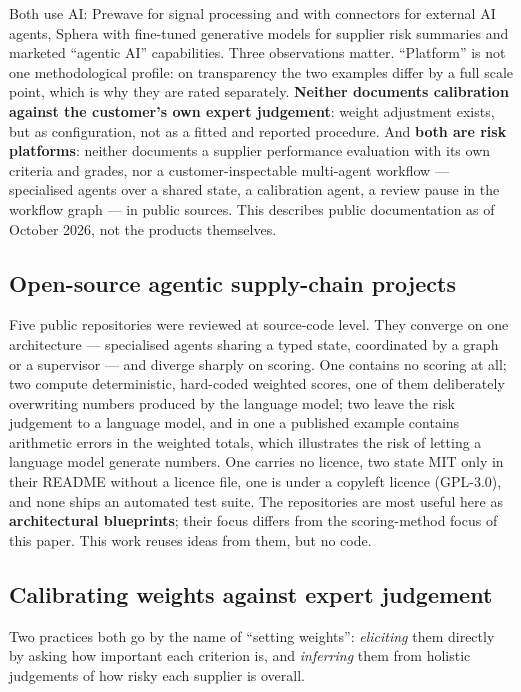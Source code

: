 \documentclass[10pt,twocolumn,a4paper]{article}
\begin{document}
Both use AI: Prewave for signal processing and with connectors for external AI agents,
Sphera with fine-tuned generative models for supplier risk summaries and marketed
``agentic AI'' capabilities. Three observations matter. ``Platform'' is not one
methodological profile: on transparency the two examples differ by a full scale point,
which is why they are rated separately. \textbf{Neither documents calibration against
the customer's own expert judgement}: weight adjustment exists, but as configuration,
not as a fitted and reported procedure. And \textbf{both are risk platforms}: neither
documents a supplier performance evaluation with its own criteria and grades, nor a
customer-inspectable multi-agent workflow --- specialised agents over a shared state, a
calibration agent, a review pause in the workflow graph --- in public sources. This
describes public documentation as of October 2026, not the products themselves.

\subsection{Open-source agentic supply-chain projects}
Five public repositories were reviewed at source-code level. They converge on one
architecture --- specialised agents sharing a typed state, coordinated by a graph or a
supervisor --- and diverge sharply on scoring. One contains no scoring at all; two
compute deterministic, hard-coded weighted scores, one of them deliberately overwriting
numbers produced by the language model; two leave the risk judgement to a language
model, and in one a published example contains arithmetic errors in the weighted
totals, which illustrates the risk of letting a language model generate numbers. One carries no licence, two state MIT only in their README without a licence file, one is under a copyleft licence (GPL-3.0), and none ships an automated test
suite. The repositories are most useful here as \textbf{architectural blueprints}; their
focus differs from the scoring-method focus of this paper. This work reuses ideas from
them, but no code.

\subsection{Calibrating weights against expert judgement}
Two practices both go by the name of ``setting weights'': \emph{eliciting} them directly
by asking how important each criterion is, and \emph{inferring} them from holistic
judgements of how risky each supplier is overall.
\end{document}
